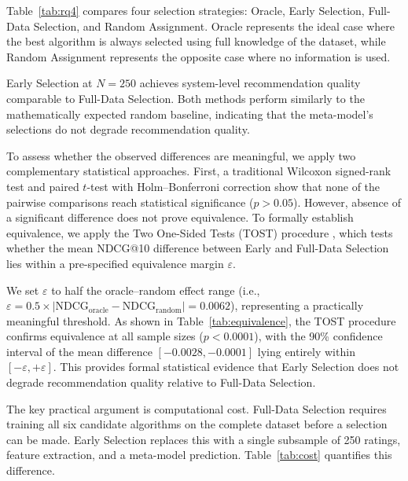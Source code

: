 \documentclass[conference]{IEEEtran}
\begin{document}
Table~\ref{tab:rq4} compares four selection strategies: Oracle, Early Selection, Full-Data Selection, and Random Assignment. Oracle represents the ideal case where the best algorithm is always selected using full knowledge of the dataset, while Random Assignment represents the opposite case where no information is used.



Early Selection at $N = 250$ achieves system-level recommendation quality comparable to Full-Data Selection. Both methods perform similarly to the mathematically expected random baseline, indicating that the meta-model's selections do not degrade recommendation quality.

To assess whether the observed differences are meaningful, we apply two complementary statistical approaches. First, a traditional Wilcoxon signed-rank test and paired $t$-test with Holm--Bonferroni correction show that none of the pairwise comparisons reach statistical significance ($p > 0.05$). However, absence of a significant difference does not prove equivalence. To formally establish equivalence, we apply the Two One-Sided Tests (TOST) procedure \cite{schuirmann1987tost, lakens2017equivalence}, which tests whether the mean NDCG@10 difference between Early and Full-Data Selection lies within a pre-specified equivalence margin $\varepsilon$.

We set $\varepsilon$ to half the oracle--random effect range (i.e., $\varepsilon = 0.5 \times |\text{NDCG}_{\text{oracle}} - \text{NDCG}_{\text{random}}| = 0.0062$), representing a practically meaningful threshold. As shown in Table~\ref{tab:equivalence}, the TOST procedure confirms equivalence at all sample sizes ($p < 0.0001$), with the 90\% confidence interval of the mean difference $[-0.0028, -0.0001]$ lying entirely within $[-\varepsilon, +\varepsilon]$. This provides formal statistical evidence that Early Selection does not degrade recommendation quality relative to Full-Data Selection.



The key practical argument is computational cost. Full-Data Selection requires training all six candidate algorithms on the complete dataset before a selection can be made. Early Selection replaces this with a single subsample of 250 ratings, feature extraction, and a meta-model prediction. Table~\ref{tab:cost} quantifies this difference.


\end{document}
